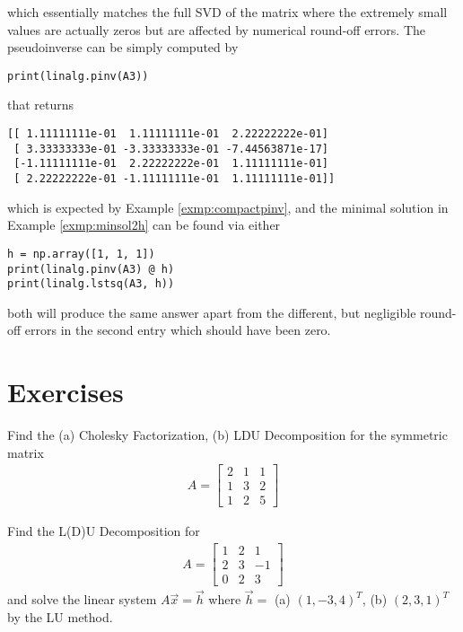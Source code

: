 which essentially matches the full SVD of the matrix where the extremely small values are actually zeros but are affected by numerical round-off errors. The pseudoinverse can be simply computed by
\begin{lstlisting}
print(linalg.pinv(A3))    
\end{lstlisting}
that returns
\begin{lstlisting}
[[ 1.11111111e-01  1.11111111e-01  2.22222222e-01]
 [ 3.33333333e-01 -3.33333333e-01 -7.44563871e-17]
 [-1.11111111e-01  2.22222222e-01  1.11111111e-01]
 [ 2.22222222e-01 -1.11111111e-01  1.11111111e-01]]    
\end{lstlisting}
which is expected by Example \ref{exmp:compactpinv}, and the minimal solution in Example \ref{exmp:minsol2h} can be found via either
\begin{lstlisting}
h = np.array([1, 1, 1])
print(linalg.pinv(A3) @ h)
print(linalg.lstsq(A3, h))    
\end{lstlisting}
both will produce the same answer apart from the different, but negligible round-off errors in the second entry which should have been zero.

\section{Exercises}

\begin{Exercise}
Find the (a) Cholesky Factorization, (b) LDU Decomposition for the symmetric matrix
\begin{align*}
A = 
\begin{bmatrix}
2 & 1 & 1 \\
1 & 3 & 2 \\
1 & 2 & 5
\end{bmatrix}
\end{align*}
\end{Exercise}

\begin{Exercise}
Find the L(D)U Decomposition for
\begin{align*}
A = 
\begin{bmatrix}
1 & 2 & 1 \\
2 & 3 & -1 \\
0 & 2 & 3
\end{bmatrix}
\end{align*}
and solve the linear system $A\vec{x} = \vec{h}$ where $\vec{h} =$ (a) $(1,-3,4)^T$, (b) $(2,3,1)^T$ by the LU method.
\end{Exercise}

